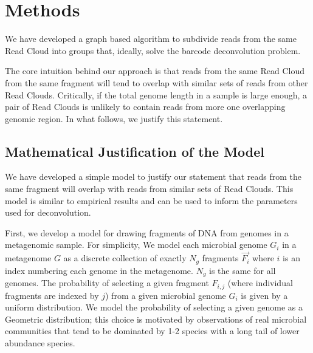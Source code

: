 \section*{Methods}


\label{sec:barcode-deconvolution}

We have developed a graph based algorithm to subdivide reads from the same Read Cloud into groups that, ideally, solve the barcode deconvolution problem. %

The core intuition behind our approach is that reads from the same Read Cloud from the same fragment will tend to overlap with similar sets of reads from other Read Clouds. Critically, if the total genome length in a sample is large enough, a pair of Read Clouds is unlikely to contain reads from more one overlapping genomic region. In what follows, we justify this statement.



\subsection*{Mathematical Justification of the Model}
\label{sec:math-model}
We have developed a simple model to justify our statement that reads from the same fragment will overlap with reads from similar sets of Read Clouds. This model is similar to empirical results and can be used to inform the parameters used for deconvolution.

First, we develop a model for drawing fragments of DNA from genomes in a metagenomic sample. For simplicity, We model each microbial genome $G_i$ in a metagenome $G$ as a discrete collection of exactly $N_g$ fragments $\vec{F_i}$ where $i$ is an index numbering each genome in the metagenome. $N_g$ is the same for all genomes. The probability of selecting a given fragment $F_{i,j}$ (where individual fragments are indexed by $j$) from a given microbial genome $G_i$ is given by a uniform distribution. We model the probability of selecting a given genome as a Geometric distribution; this choice is motivated by observations of real microbial communities that tend to be dominated by 1-2 species with a long tail of lower abundance species. 

